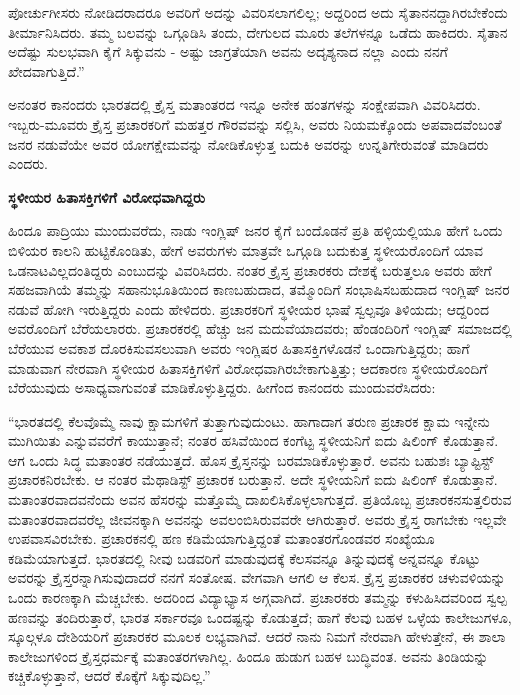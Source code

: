 ಪೋರ್ಚುಗೀಸರು ನೋಡಿದರಾದರೂ ಅವರಿಗೆ ಅದನ್ನು ವಿವರಿಸಲಾಗಲಿಲ್ಲ; ಅದ್ದರಿಂದ ಅದು ಸೈತಾನನದ್ದಾಗಿರಬೇಕೆಂದು ತೀರ್ಮಾನಿಸಿದರು. ತಮ್ಮ ಬಲವನ್ನು ಒಗ್ಗೂಡಿಸಿ ತಂದು, ದೇಗುಲದ ಮೂರು ತಲೆಗಳನ್ನೂ ಒಡೆದು ಹಾಕಿದರು. ಸೈತಾನ ಅದೆಷ್ಟು ಸುಲಭವಾಗಿ ಕೈಗೆ ಸಿಕ್ಕುವನು - ಅಷ್ಟು ಜಾಗ್ರತೆಯಾಗಿ ಅವನು ಅದೃಶ್ಯನಾದ ನಲ್ಲಾ ಎಂದು ನನಗೆ ಖೇದವಾಗುತ್ತಿದೆ.”

ಅನಂತರ ಕಾನಂದರು ಭಾರತದಲ್ಲಿ ಕ್ರೈಸ್ತ ಮತಾಂತರದ ಇನ್ನೂ ಅನೇಕ ಹಂತಗಳನ್ನು ಸಂಕ್ಷೇಪವಾಗಿ ವಿವರಿಸಿದರು. ಇಬ್ಬರು-ಮೂವರು ಕ್ರೈಸ್ತ ಪ್ರಚಾರಕರಿಗೆ ಮಹತ್ತರ ಗೌರವವನ್ನು ಸಲ್ಲಿಸಿ, ಅವರು ನಿಯಮಕ್ಕೊಂದು ಅಪವಾದವೆಂಬಂತೆ ಜನರ ನಡುವೆಯೇ ಅವರ ಯೋಗಕ್ಷೇಮವನ್ನು ನೋಡಿಕೊಳ್ಳುತ್ತ ಬದುಕಿ ಅವರನ್ನು ಉನ್ನತಿಗೇರುವಂತೆ ಮಾಡಿದರು ಎಂದರು.

\begin{center}
\textbf{ಸ್ಥಳೀಯರ ಹಿತಾಸಕ್ತಿಗಳಿಗೆ ವಿರೋಧವಾಗಿದ್ದರು}
\end{center}

ಹಿಂದೂ ಪಾದ್ರಿಯು ಮುಂದುವರೆದು, ನಾಡು ಇಂಗ್ಲಿಷ್ ಜನರ ಕೈಗೆ ಬಂದೊಡನೆ ಪ್ರತಿ ಹಳ್ಳಿಯಲ್ಲಿಯೂ ಹೇಗೆ ಒಂದು ಬಿಳಿಯರ ಕಾಲನಿ ಹುಟ್ಟಿಕೊಂಡಿತು, ಹೇಗೆ ಅವರುಗಳು ಮಾತ್ರವೇ ಒಗ್ಗೂಡಿ ಬದುಕುತ್ತ ಸ್ಥಳೀಯರೊಂದಿಗೆ ಯಾವ ಒಡನಾಟವಿಲ್ಲದಂತಿದ್ದರು ಎಂಬುದನ್ನು ವಿವರಿಸಿದರು. ನಂತರ ಕ್ರೈಸ್ತ ಪ್ರಚಾರಕರು ದೇಶಕ್ಕೆ ಬರುತ್ತಲೂ ಅವರು ಹೇಗೆ ಸಹಜವಾಗಿಯೆ ತಮ್ಮನ್ನು ಸಹಾನುಭೂತಿಯಿಂದ ಕಾಣಬಹುದಾದ, ತಮ್ಮೊಂದಿಗೆ ಸಂಭಾಷಿಸಬಹುದಾದ ಇಂಗ್ಲಿಷ್ ಜನರ ನಡುವೆ ಹೋಗಿ ಇರುತ್ತಿದ್ದರು ಎಂದು ಹೇಳಿದರು. ಪ್ರಚಾರಕರಿಗೆ ಸ್ಥಳೀಯರ ಭಾಷೆ ಸ್ವಲ್ಪವೂ ತಿಳಿಯದು; ಆದ್ದರಿಂದ ಅವರೊಂದಿಗೆ ಬೆರೆಯಲಾರರು. ಪ್ರಚಾರಕರಲ್ಲಿ ಹೆಚ್ಚು ಜನ ಮದುವೆಯಾದವರು; ಹೆಂಡಂದಿರಿಗೆ ಇಂಗ್ಲಿಷ್ ಸಮಾಜದಲ್ಲಿ ಬೆರೆಯುವ ಅವಕಾಶ ದೊರಕಿಸುವಸಲುವಾಗಿ ಅವರು ಇಂಗ್ಲಿಷರ ಹಿತಾಸಕ್ತಿಗಳೊಡನೆ ಒಂದಾಗುತ್ತಿದ್ದರು; ಹಾಗೆ ಮಾಡುವಾಗ ನೇರವಾಗಿ ಸ್ಥಳೀಯರ ಹಿತಾಸಕ್ತಿಗಳಿಗೆ ವಿರೋಧವಾಗಿರಬೇಕಾಗುತ್ತಿತ್ತು; ಆದಕಾರಣ ಸ್ಥಳೀಯರೊಂದಿಗೆ ಬೆರೆಯುವುದು ಅಸಾಧ್ಯವಾಗುವಂತೆ ಮಾಡಿಕೊಳ್ಳುತ್ತಿದ್ದರು. ಹೀಗೆಂದ ಕಾನಂದರು ಮುಂದುವರೆಸಿದರು:

“ಭಾರತದಲ್ಲಿ ಕೆಲವೊಮ್ಮೆ ನಾವು ಕ್ಷಾಮಗಳಿಗೆ ತುತ್ತಾಗುವುದುಂಟು. ಹಾಗಾದಾಗ ತರುಣ ಪ್ರಚಾರಕ ಕ್ಷಾಮ ಇನ್ನೇನು ಮುಗಿಯಿತು ಎನ್ನುವವರೆಗೆ ಕಾಯುತ್ತಾನೆ; ನಂತರ ಹಸಿವೆಯಿಂದ ಕಂಗೆಟ್ಟ ಸ್ಥಳೀಯನಿಗೆ ಐದು ಷಿಲಿಂಗ್ ಕೊಡುತ್ತಾನೆ. ಆಗ ಒಂದು ಸಿದ್ಧ ಮತಾಂತರ ನಡೆಯುತ್ತದೆ. ಹೊಸ ಕ್ರೈಸ್ತನನ್ನು ಬರಮಾಡಿಕೊಳ್ಳುತ್ತಾರೆ. ಅವನು ಬಹುಶಃ ಬ್ಯಾಪ್ಟಿಸ್ಟ್ ಪ್ರಚಾರಕನಿರಬೇಕು. ಆ ನಂತರ ಮೆಥಾಡಿಸ್ಟ್ ಪ್ರಚಾರಕ ಬರುತ್ತಾನೆ. ಅದೇ ಸ್ಥಳೀಯನಿಗೆ ಐದು ಷಿಲಿಂಗ್ ಕೊಡುತ್ತಾನೆ. ಮತಾಂತರವಾದವನೆಂದು ಅವನ ಹೆಸರನ್ನು ಮತ್ತೊಮ್ಮೆ ದಾಖಲಿಸಿಕೊಳ್ಳಲಾಗುತ್ತದೆ. ಪ್ರತಿಯೊಬ್ಬ ಪ್ರಚಾರಕನಸುತ್ತಲಿರುವ ಮತಾಂತರವಾದವರೆಲ್ಲ ಜೀವನಕ್ಕಾಗಿ ಅವನನ್ನು ಅವಲಂಬಿಸಿರುವವರೇ ಆಗಿರುತ್ತಾರೆ. ಅವರು ಕ್ರೈಸ್ತ ರಾಗಬೇಕು ಇಲ್ಲವೇ ಉಪವಾಸವಿರಬೇಕು. ಪ್ರಚಾರಕನಲ್ಲಿ ಹಣ ಕಡಿಮೆಯಾಗುತ್ತಿದ್ದಂತೆ ಮತಾಂತರಗೊಂಡವರ ಸಂಖ್ಯೆಯೂ ಕಡಿಮೆಯಾಗುತ್ತದೆ. ಭಾರತದಲ್ಲಿ ನೀವು ಬಡವರಿಗೆ ಮಾಡುವುದಕ್ಕೆ ಕೆಲಸವನ್ನೂ ತಿನ್ನುವುದಕ್ಕೆ ಅನ್ನವನ್ನೂ ಕೊಟ್ಟು ಅವರನ್ನು ಕ್ರೈಸ್ತರನ್ನಾಗಿಸುವುದಾದರೆ ನನಗೆ ಸಂತೋಷ. ವೇಗವಾಗಿ ಆಗಲಿ ಆ ಕೆಲಸ. ಕ್ರೈಸ್ತ ಪ್ರಚಾರಕರ ಚಳುವಳಿಯನ್ನು ಒಂದು ಕಾರಣಕ್ಕಾಗಿ ಮೆಚ್ಚಬೇಕು. ಅದರಿಂದ ವಿದ್ಯಾಭ್ಯಾಸ ಅಗ್ಗವಾಗಿದೆ. ಪ್ರಚಾರಕರು ತಮ್ಮನ್ನು ಕಳುಹಿಸಿದವರಿಂದ ಸ್ವಲ್ಪ ಹಣವನ್ನು ತಂದಿರುತ್ತಾರೆ, ಭಾರತ ಸರ್ಕಾರವೂ ಒಂದಷ್ಟನ್ನು ಕೊಡುತ್ತದೆ; ಹಾಗೆ ಕೆಲವು ಬಹಳ ಒಳ್ಳೆಯ ಕಾಲೇಜುಗಳೂ, ಸ್ಕೂಲ್ಗಳೂ ದೇಶಿಯರಿಗೆ ಪ್ರಚಾರಕರ ಮೂಲಕ ಲಭ್ಯವಾಗಿವೆ. ಆದರೆ ನಾನು ನಿಮಗೆ ನೇರವಾಗಿ ಹೇಳುತ್ತೇನೆ, ಈ ಶಾಲಾ ಕಾಲೇಜುಗಳಿಂದ ಕ್ರೈಸ್ತಧರ್ಮಕ್ಕೆ ಮತಾಂತರಗಳಾಗಿಲ್ಲ. ಹಿಂದೂ ಹುಡುಗ ಬಹಳ ಬುದ್ಧಿವಂತ. ಅವನು ತಿಂಡಿಯನ್ನು ಕಚ್ಚಿಕೊಳ್ಳುತ್ತಾನೆ, ಆದರೆ ಕೊಕ್ಕೆಗೆ ಸಿಕ್ಕುವುದಿಲ್ಲ.”

